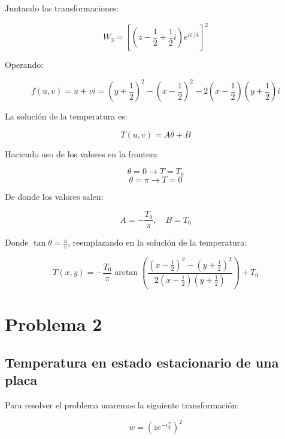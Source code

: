 \documentclass[a4paper,12pt]{article}
\begin{document}
Juntando las transformaciones:

\begin{equation*}
W_3 = \left[ \left( z - \frac{1}{2} + \frac{1}{2}i \right) e^{i\pi/4} \right]^2
\end{equation*}

Operando:

\begin{equation*}
f(u,v) = u + vi = \left( y + \frac{1}{2} \right)^2 - \left( x - \frac{1}{2} \right)^2 - 2\left( x - \frac{1}{2} \right)\left( y + \frac{1}{2} \right)i
\end{equation*}

La solución de la temperatura es:

\begin{equation*}
T(u,v) = A\theta + B
\end{equation*}

Haciendo uso de los valores en la frontera

\begin{equation*}
\theta = 0 \rightarrow T = T_0
\end{equation*}
\begin{equation*}
\theta = \pi \rightarrow T = 0
\end{equation*}

De donde los valores salen:

\begin{equation*}
A = -\frac{T_0}{\pi}, \quad B = T_0
\end{equation*}

Donde \( \tan\theta = \frac{u}{v} \), reemplazando en la solución de la temperatura:

\begin{equation*}
T(x,y) = -\frac{T_0}{\pi} \arctan\left( \frac{\left( x - \frac{1}{2} \right)^2 - \left( y + \frac{1}{2} \right)^2}{2\left( x - \frac{1}{2} \right)\left( y + \frac{1}{2} \right)} \right) + T_0
\end{equation*}
\section*{Problema 2}
\subsection*{Temperatura en estado estacionario de una placa}


Para resolver el problema usaremos la siguiente transformación:

\[
w = \left( z e^{-i\frac{\pi}{4}} \right)^{2}
\]
\end{document}

